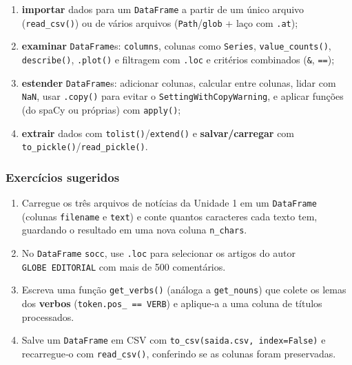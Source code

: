 \documentclass[
  brazilian,
  11pt,
]{article}
\providecommand{\tightlist}{%
  \setlength{\itemsep}{0pt}\setlength{\parskip}{0pt}}
\let\oldtexttt\texttt
\renewcommand{\texttt}[1]{{\color{inlink}\oldtexttt{#1}}}
\begin{document}
\begin{enumerate}
\def\labelenumi{\arabic{enumi}.}
\tightlist
\item
  \textbf{importar} dados para um \texttt{DataFrame} a partir de um
  único arquivo (\texttt{read\_csv()}) ou de vários arquivos
  (\texttt{Path}/\texttt{glob} + laço com \texttt{.at});
\item
  \textbf{examinar} \texttt{DataFrame}s: \texttt{columns}, colunas como
  \texttt{Series}, \texttt{value\_counts()}, \texttt{describe()},
  \texttt{.plot()} e filtragem com \texttt{.loc} e critérios combinados
  (\texttt{\&}, \texttt{==});
\item
  \textbf{estender} \texttt{DataFrame}s: adicionar colunas, calcular
  entre colunas, lidar com \texttt{NaN}, usar \texttt{.copy()} para
  evitar o \texttt{SettingWithCopyWarning}, e aplicar funções (do spaCy
  ou próprias) com \texttt{apply()};
\item
  \textbf{extrair} dados com \texttt{tolist()}/\texttt{extend()} e
  \textbf{salvar/carregar} com
  \texttt{to\_pickle()}/\texttt{read\_pickle()}.
\end{enumerate}

\subsubsection{Exercícios sugeridos}\label{exercuxedcios-sugeridos}

\begin{enumerate}
\def\labelenumi{\arabic{enumi}.}
\tightlist
\item
  Carregue os três arquivos de notícias da Unidade 1 em um
  \texttt{DataFrame} (colunas \texttt{filename} e \texttt{text}) e conte
  quantos caracteres cada texto tem, guardando o resultado em uma nova
  coluna \texttt{n\_chars}.
\item
  No \texttt{DataFrame} \texttt{socc}, use \texttt{.loc} para selecionar
  os artigos do autor \texttt{GLOBE\ EDITORIAL} com mais de 500
  comentários.
\item
  Escreva uma função \texttt{get\_verbs()} (análoga a
  \texttt{get\_nouns}) que colete os lemas dos \textbf{verbos}
  (\texttt{token.pos\_\ ==\ \textquotesingle{}VERB\textquotesingle{}}) e
  aplique‑a a uma coluna de títulos processados.
\item
  Salve um \texttt{DataFrame} em CSV com
  \texttt{to\_csv(\textquotesingle{}saida.csv\textquotesingle{},\ index=False)}
  e recarregue‑o com \texttt{read\_csv()}, conferindo se as colunas
  foram preservadas.
\end{enumerate}
\end{document}
